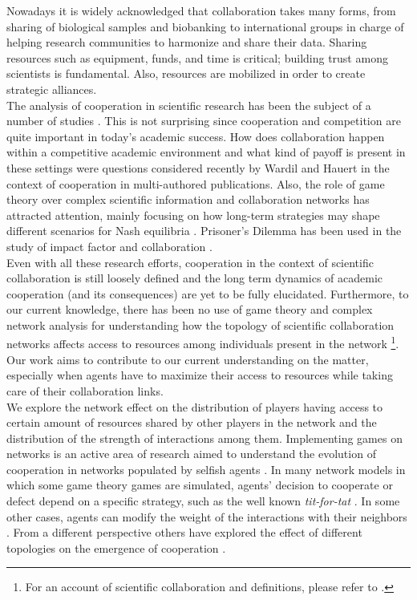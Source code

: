 \documentclass{bmcart}
\begin{document}
Nowadays it is widely acknowledged that collaboration takes many
forms, from sharing of biological samples and biobanking to
international groups in charge of helping research communities to
harmonize and share their data. Sharing resources such as equipment,
funds, and time is critical; building trust among scientists is
fundamental. Also, resources are mobilized in order to create strategic alliances.\\


The analysis of cooperation in scientific research has been the subject of a
number of studies
\cite{VermeulenPenders:2013,Newman:2001,Newman:2004,Elango-etal:2012,HernandezLemus:2013,Strasser:2006,Strasser:2012}. This
is not surprising since cooperation and competition are quite important in
today's academic success. How does collaboration happen within a competitive
academic environment and what kind of payoff is present in these settings were
questions considered recently by Wardil and Hauert \cite{Wardil-etal:2015} in the
context of cooperation in multi-authored publications. Also, the role of game
theory over complex scientific information and collaboration networks has
attracted attention, mainly focusing on how long-term strategies may shape
different scenarios for Nash equilibria \cite{Hanauske-etal:2012}. Prisoner's Dilemma
has been used in the study of impact factor and collaboration
\cite{Hara-etal:2003,LiebermanNowak:2005}. \\  


Even with all these research efforts, cooperation in the context of
scientific collaboration is still loosely defined and the long term
dynamics of academic cooperation (and its consequences) are yet to be
fully elucidated. Furthermore, to our current knowledge, there has
been no use of game theory and complex network analysis for
understanding how the topology of scientific collaboration networks
affects access to resources among individuals present in the network
\footnote{For an account of scientific collaboration and definitions,
  please refer to \cite{Sonnenwald:2007}.}. Our work aims to contribute
to our current understanding on the matter, especially when agents have
to maximize their access to resources while taking care of their collaboration links.\\
  

 We explore the network effect on the distribution
   of players having access to certain amount of resources shared by other players in the
   network and the distribution of the strength of interactions among
   them. Implementing games on networks is an active area of
research aimed to understand the evolution of cooperation in networks populated
by selfish agents \cite{SzaboFath:2007,Nowak-etal:92,OshtukiNowak:2006,Santos-etal:2005,Santos-etal:2006}. In many network models in which some game theory games are simulated, agents' decision to cooperate
or defect depend on a specific strategy, such as the well known
\textit{tit-for-tat} \cite{Axelrod:2006,Nowak-etal:2011}. In some other cases, agents
can modify the weight of the interactions with their neighbors
\cite{Santos-etal:2006}. From a different perspective others have explored the effect
of different topologies on the emergence of cooperation
\cite{Santos-etal:2005,HauertDoebeli:2004}. 
   
\end{document}
